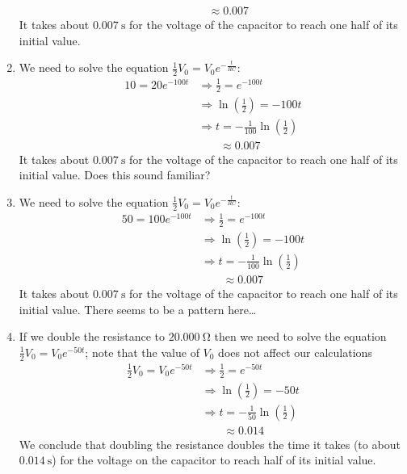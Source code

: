 \begin{pccexample}
\begin{pccsolution}
\begin{enumerate}
\begin{align*}
				                 & \phantom{ {}\Rightarrow t}\approx 0.007                 
			\end{align*}
			It takes about $\SI{0.007}{\second}$ for the voltage of the capacitor to 
			reach one half of its initial value.
			\item We need to solve the equation $\frac{1}{2}V_0=V_0e^{-\frac{t}{RC}}$:
			\begin{align*}
				10 = 20 e^{-100t} & \Rightarrow \frac{1}{2}=e^{-100t}                       \\
				                  & \Rightarrow \ln\left(\frac{1}{2}\right)=-100t           \\
				                  & \Rightarrow t=-\frac{1}{100}\ln\left(\frac{1}{2}\right) \\
				                  & \phantom{ {}\Rightarrow t}\approx 0.007                 
			\end{align*}
			It takes about $\SI{0.007}{\second}$ for the voltage of the capacitor to 
			reach one half of its initial value. Does this sound familiar?
			\item We need to solve the equation $\frac{1}{2}V_0=V_0e^{-\frac{t}{RC}}$:
			\begin{align*}
				50 = 100 e^{-100t} & \Rightarrow \frac{1}{2}=e^{-100t}                       \\
				                   & \Rightarrow \ln\left(\frac{1}{2}\right)=-100t           \\
				                   & \Rightarrow t=-\frac{1}{100}\ln\left(\frac{1}{2}\right) \\
				                   & \phantom{ {}\Rightarrow t}\approx 0.007                 
			\end{align*}
			It takes about $\SI{0.007}{\second}$ for the voltage of the capacitor to 
			reach one half of its initial value. There seems to be a pattern here\ldots
			\item If we double the resistance to $\SI{20,000}{\ohm}$ then we need 
			to solve the equation $\frac{1}{2}V_0=V_0e^{-50t}$; note that the value of $V_0$
			does not affect our calculations
			\begin{align*}
				\frac{1}{2}V_0 = V_0 e^{-50t} & \Rightarrow \frac{1}{2}=e^{-50t}                       \\
				                              & \Rightarrow \ln\left(\frac{1}{2}\right)=-50t           \\
				                              & \Rightarrow t=-\frac{1}{50}\ln\left(\frac{1}{2}\right) \\
				                              & \phantom{ {}\Rightarrow t}\approx 0.014                
			\end{align*}
			We conclude that doubling the resistance doubles the time  it takes (to about $\SI{0.014}{\second}$) 
			for the voltage on the capacitor to reach half of its initial value.
		\end{enumerate}
	\end{pccsolution}
\end{pccexample}


